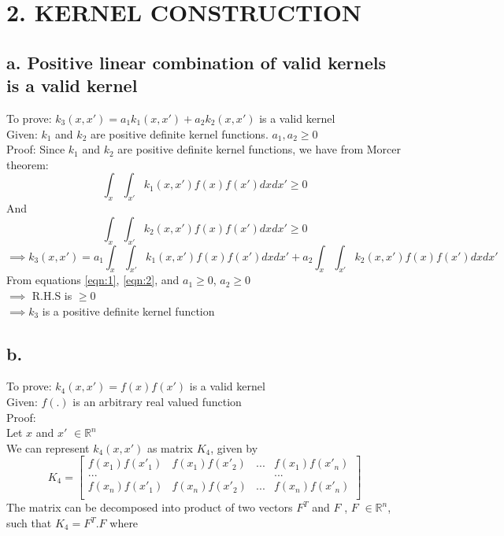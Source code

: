 \documentclass[letterpaper,doc,notimes]{apa6}
\begin{document}
\section{2. KERNEL CONSTRUCTION}

\subsection{a. Positive linear combination of valid kernels is a valid kernel}
To prove: $k_3(x, x') = a_1k_1(x, x') + a_2k_2(x, x')$ is a valid kernel \\
Given: $k_1$ and $k_2$ are positive definite kernel functions. $a_1, a_2 \ge 0 $ \\
Proof:
    Since $k_1$ and $k_2$ are positive definite kernel functions, we have from Morcer theorem:
    \begin{equation}\label{eqn:1}
			\int_{x}\int_{x'}k_1(x, x') f(x) f(x') dx dx' \ge 0
    \end{equation}
    And 
    \begin{equation} \label{eqn:2}
   \int_{x}\int_{x'}k_2(x, x') f(x) f(x') dx dx' \ge 0
   \end{equation}
  $$
  \implies k_3(x, x') = a_1\int_{x}\int_{x'}k_1(x, x') f(x) f(x') dx dx' + a_2\int_{x}\int_{x'}k_2(x, x') f(x) f(x') dx dx' 
$$
From equations \ref{eqn:1},  \ref{eqn:2}, and $a_1 \ge 0 $, $a_2 \ge 0 $ \\
 $\implies$ R.H.S is $\ge 0$ \\
 $\implies k_3$ is a positive definite kernel function

\subsection{b. }
To prove: $k_4(x, x') = f(x) f(x')$ is a valid kernel \\
Given: $f(.)$ is an arbitrary real valued function\\
Proof: \\
Let $x$ and $x'$  $\in \mathbb{R}^{n}$ \\
We can represent $k_4(x,x')$ as matrix $K_4$, given by
$$ K_4= \begin{bmatrix}
f(x_1)f(x'_1) & f(x_1)f(x'_2) & ... & f(x_1)f(x'_n)  \\
... &  &  & ... \\
f(x_n)f(x'_1) & f(x_n)f(x'_2) & ... & f(x_n)f(x'_n)  \\
\end{bmatrix} $$
The matrix can be decomposed into product of two vectors $F^T$ and $F$ , $F$ $\in \mathbb{R}^n$, such that $K_4 = F^T. F $ where 
\end{document}
